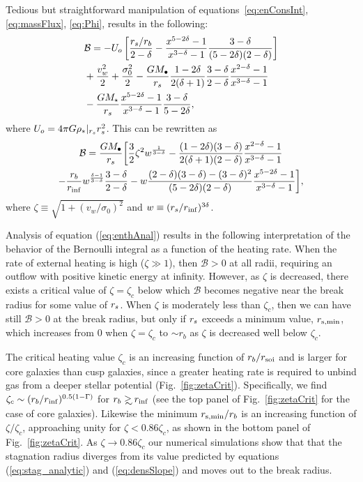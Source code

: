 Tedious but straightforward manipulation of equations~\eqref{eq:enConsInt}, \eqref{eq:massFlux}, \eqref{eq:Phi}, results in the following:
\begin{align}
  &\mathcal{B} = -U_o\left[\frac{r_s/r_b}{2-\delta}-\frac{x^{5-2\delta}-1}{x^{3-\delta}-1}\frac{3-\delta}{(5-2\delta)(2-\delta)}\right]\nonumber\\
  &+\frac{v_w^2}{2}+\frac{\sigma_0^2}{2}- \frac{G M_{\bullet}}{r_s}
  \frac{1-2\delta}{2(\delta+1)}
  \frac{3-\delta}{2-\delta}\frac{x^{2-\delta}-1}{x^{3-\delta}-1}
  \nonumber\\
  &-\frac{G M_\star}{r_s}
  \frac{x^{5-2\delta}-1}{x^{3-\delta}-1}\frac{3-\delta}{5-2\delta},
\end{align}
where $U_o=4 \pi G \rho_*|_{r_s} r_s^2$.  This can be rewritten as
\begin{multline}
  \mathcal{B} =\frac{G M_{\bullet}}{r_s} \biggl[ \frac{3}{2} \zeta^2
  w^{\frac{1}{3 -\delta}}
  -\frac{(1-2\delta)(3-\delta)}{2(\delta+1)(2-\delta)}  \frac{x^{2  -\delta}-1}{x^{3-\delta}-1}\\
  -\frac{r_b}{r_{\rm inf}} w^{\frac{\delta-1}{3-\delta}} \frac{3 -\delta}{2
    -\delta} -w
  \frac{(2-\delta)(3-\delta)-(3-\delta)^{2}}{(5-2\delta)(2-\delta)}
  \frac{x^{5-2\delta}-1}{x^{3-\delta}-1} \biggr],
\label{eq:enthAnal}
\end{multline}
where $\zeta \equiv \sqrt{1 + (v_w/\sigma_0)^2}$ and $w\equiv
(r_s/r_{\rm inf})^{3\delta}$.

Analysis of equation (\ref{eq:enthAnal}) results in the following
interpretation of the behavior of the Bernoulli integral as a function
of the heating rate.  When the rate of external heating is high
($\zeta \gg 1$), then $\mathcal{B} > 0$ at all radii, requiring an
outflow with positive kinetic energy at infinity.  However, as $\zeta$
is decreased, there exists a critical value of $\zeta = \zeta_{c}$
below which $\mathcal{B}$ becomes negative near the break radius for
some value of $r_s$.  When $\zeta$ is moderately less than $\zeta_c$,
then we can have still $\mathcal{B} > 0$ at the break radius, but only
if $r_s$ exceeds a minimum value, $r_{\rm s,min}$, which increases
from 0 when $\zeta = \zeta_c$ to $\sim r_{b}$ as $\zeta$ is decreased
well below $\zeta_c$.

The critical heating value $\zeta_c$ is an increasing function of
$r_{b}/r_{\rm soi}$ and is larger for core galaxies than cusp
galaxies, since a greater heating rate is required to unbind gas from
a deeper stellar potential (Fig.~\ref{fig:zetaCrit}).  Specifically,
we find $\zeta_c\sim (r_b/r_{\rm inf})^{0.5(1-\Gamma)}$ for $\rb\gsim\rinf$
(see the top panel of Fig.~\ref{fig:zetaCrit} for the case of core
galaxies). Likewise the minimum $r_{\rm s,min}/r_{b}$ is an increasing
function of $\zeta/\zeta_{c}$, approaching unity for $\zeta <
0.86\zeta_c$, as shown in the bottom panel of Fig.~\ref{fig:zetaCrit}.
As $\zeta \rightarrow 0.86\zeta_c$ our numerical simulations show that
that the stagnation radius diverges from its value predicted by
equations (\ref{eq:stag_analytic}) and (\ref{eq:densSlope}) and moves
out to the break radius.


